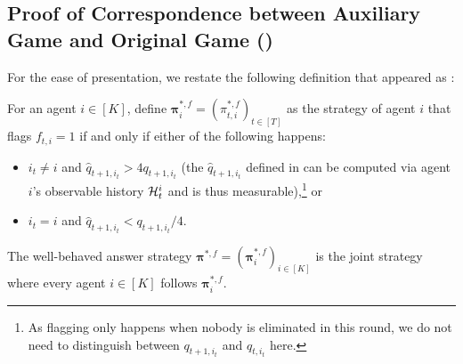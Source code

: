 \subsection{Proof of Correspondence between Auxiliary Game and Original Game ()}\label{sec:equiv between actual and no-flagging formal}
For the ease of presentation, we restate the following definition that appeared as :
\begin{definition}\label{def:well-behaved flagging formal}
For an agent $i\in [K]$, define ${\bm \pi}_i^{\ast,f}=(\pi_{t,i}^{\ast,f})_{t\in [T]}$ as the strategy of agent $i$ that flags $f_{t,i}=1$ if and only if either of the following happens:
\begin{itemize}
\item $i_t\neq i$ and $\hat q_{t+1,i_t}>4q_{t+1,i_t}$ (the $\hat q_{t+1,i_t}$ defined in  can be computed via agent $i$'s observable history $\mathcal{H}_t^i$ and is thus measurable),\footnote{As flagging only happens when nobody is eliminated in this round, we do not need to distinguish between $q_{t+1,i_t}$ and $q_{t,i_t}$ here.} or
\item $i_t=i$ and $\hat q_{t+1,i_t}<q_{t+1,i_t}/4$.
\end{itemize}
The well-behaved answer strategy ${\bm \pi}^{\ast,f}=({\bm \pi}_i^{\ast,f})_{i\in [K]}$ is the joint strategy where every agent $i\in [K]$ follows ${\bm \pi}_i^{\ast,f}$.
\end{definition}

